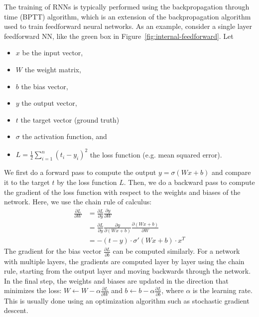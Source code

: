\documentclass{article}
\newcommand{\reffig}[1]{Figure~\ref{#1}}
\begin{document}
The training of RNNs is typically performed using the backpropagation through time (BPTT)
algorithm, which is an extension of the backpropagation algorithm used to train
feedforward neural networks. As an example, consider a single layer feedforward NN, like
the green box in \reffig{fig:internal-feedforward}. Let
\begin{itemize}
  \item $x$ be the input vector,
  \item $W$ the weight matrix,
  \item $b$ the bias vector,
  \item $y$ the output vector,
  \item $t$ the target vector (ground truth)
  \item $\sigma$ the activation function, and
  \item $L = \frac{1}{2} \sum_{i=1}^{n} (t_i - y_i)^2$ the loss function (e.g. mean
        squared error).
\end{itemize}
We first do a forward pass to compute the output $y = \sigma(Wx + b)$ and compare it to
the target $t$ by the loss function $L$. Then, we do a backward pass to compute the
gradient of the loss function with respect to the weights and biases of the network. Here,
we use the chain rule of calculus:
\begin{align}
  \frac{\partial L}{\partial W} & = \frac{\partial L}{\partial y} \frac{\partial y}{\partial W}                                             \\
                                & = \frac{\partial L}{\partial y} \frac{\partial y}{\partial (Wx + b)} \frac{\partial (Wx + b)}{\partial W} \\
                                & = -(t-y) \cdot \sigma'(Wx + b) \cdot x^T
\end{align}
The gradient for the bias vector $\frac{\partial L}{\partial b}$ can be computed
similarly. For a network with multiple layers, the gradients are computed layer by layer
using the chain rule, starting from the output layer and moving backwards through the
network. In the final step, the weights and biases are updated in the direction that
minimizes the loss: $W \leftarrow W - \alpha \frac{\partial L}{\partial W}$ and $b
  \leftarrow b - \alpha \frac{\partial L}{\partial b}$, where $\alpha$ is the learning rate.
This is usually done using an optimization algorithm such as stochastic gradient descent.
\end{document}
